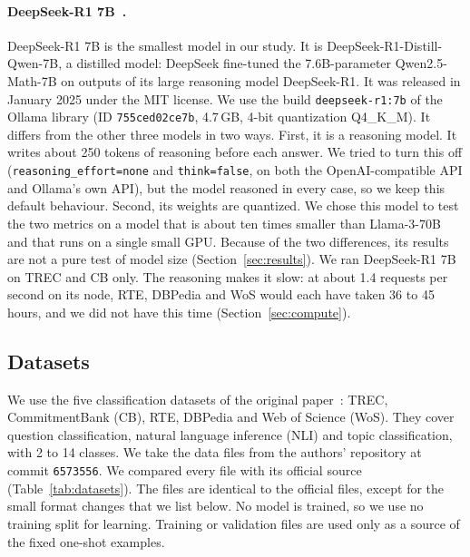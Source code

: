 \paragraph{DeepSeek-R1 7B~\cite{deepseek-r1-7b-ollama}.}
DeepSeek-R1 7B is the smallest model in our study. It is
DeepSeek-R1-Distill-Qwen-7B, a distilled model: DeepSeek fine-tuned the
7.6B-parameter Qwen2.5-Math-7B on outputs of its large reasoning model
DeepSeek-R1. It was released in January 2025 under the MIT license.
We use the build \texttt{deepseek-r1:7b} of the Ollama library (ID
\texttt{755ced02ce7b}, 4.7\,GB, 4-bit quantization Q4\_K\_M). It differs from
the other three models in two ways. First, it is a reasoning model. It writes
about 250 tokens of reasoning before each answer. We tried to turn this off
(\texttt{reasoning\_effort=none} and \texttt{think=false}, on both the
OpenAI-compatible API and Ollama's own API), but the model reasoned in every
case, so we keep this default behaviour. Second, its weights are quantized. We chose this model to test the
two metrics on a model that is about ten times smaller than Llama-3-70B and
that runs on a single small GPU. Because of the two differences, its results
are not a pure test of model size (Section~\ref{sec:results}).
We ran DeepSeek-R1 7B on TREC and CB only. The reasoning makes it slow: at
about 1.4 requests per second on its node, RTE, DBPedia and WoS would each have
taken 36 to 45 hours, and we did not have this time
(Section~\ref{sec:compute}).

\subsection{Datasets}
\label{sec:datasets}

We use the five classification datasets of the original
paper~\cite{Errica:2025}: TREC, CommitmentBank (CB), RTE, DBPedia and Web of
Science (WoS). They cover question classification, natural language inference
(NLI) and topic classification, with 2 to 14 classes. We take the data files
from the authors' repository at commit \texttt{6573556}. We compared every file
with its official source (Table~\ref{tab:datasets}). The files are identical to
the official files, except for the small format changes that we list below.
No model is trained, so we use no training split for learning. Training or
validation files are used only as a source of the fixed one-shot examples.

